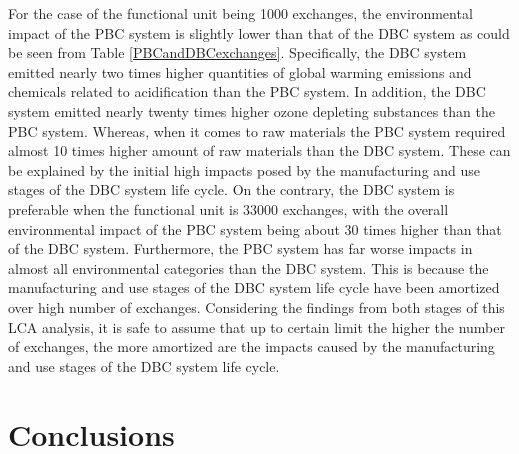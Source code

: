 \documentclass[3p,times,procedia]{elsarticle}
\begin{document}
For the case of the functional unit being 1000 exchanges, the environmental impact of the PBC system is slightly lower than that of the DBC system as could be seen from Table \ref{PBCandDBCexchanges}. Specifically, the DBC system emitted nearly two times higher quantities of global warming emissions and chemicals  related to acidification than the PBC system. In addition, the DBC system emitted nearly twenty times higher ozone depleting substances than the PBC system. Whereas, when it comes to raw materials the PBC system required almost 10 times higher amount of raw materials than the DBC system. These can be explained by the initial high impacts posed by the manufacturing and use stages of the DBC system life cycle. On the contrary, the DBC system is preferable when the functional unit is 33000 exchanges, with the overall environmental impact of the PBC system being about 30 times higher than that of the DBC system. Furthermore, the PBC system has far worse impacts in almost all environmental categories than the DBC system. This is because the manufacturing and use stages of the DBC system life cycle have been amortized over high number of exchanges. Considering the findings from both stages of this LCA analysis, it is safe to assume that up to certain limit the higher the number of exchanges, the more amortized are the impacts caused by the manufacturing and use stages of the DBC system life cycle.

\section{Conclusions}
\end{document}
